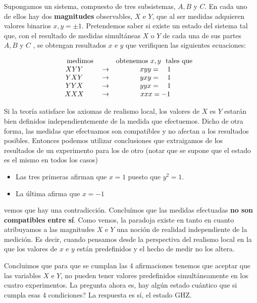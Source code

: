 \documentclass[a4paper,11pt]{book} %
\numberwithin{equation}{chapter}
\begin{document}
Supongamos un sistema, compuesto de  tres subsistemas, $A, B$ y $C$. En cada uno de ellos hay dos \textbf{magnitudes} observables, $X$ e $Y$, que al ser medidas adquieren valores binarios $x, y = \pm 1$. Pretendemos saber si existe un estado del sistema tal que, con el resultado  de  medidas simultáneas $X$ o $Y$ de cada una de sus partes $A,B$ y $C$ , se obtengan resultados $x$ e $y$ que verifiquen las siguientes ecuaciones:

$$
\begin{array}{ccc}
{\rm medimos} & & \hbox{obtenemos} ~ x,y ~~ \hbox{tales que} \\
XYY ~~~~~ &\to& ~xyy =~~~ 1\nonumber\\
YXY ~~~~~ &\to& ~yxy =~~~ 1 \\
YYX ~~~~~ &\to& ~yyx =~~~ 1\nonumber\\
XXX ~~~~~ &\to& ~xxx = -1\nonumber
\end{array}
$$

Si la teoría satisface los axiomas de realismo local,  los valores de $X$ es $Y$ estarán bien definidos independientemente de la medida que efectuemos. Dicho de otra forma, las medidas que efectuamos son compatibles y no afectan a los resultados posibles. Entonces podemos utilizar conclusiones que extraigamos de los resultados de un experimento para los de otro (notar que se supone que el estado es el mismo en todos los casos)
\begin{itemize}
	\item Las tres primeras afirman que $x=1$ puesto que $y^2=1$. 
	\item La última afirma que $x=-1$
\end{itemize}
vemos que hay una contradicción. Concluímos que las medidas efectuadas \textbf{no son compatibles entre sí}. Como vemos, la paradoja existe en tanto en cuanto atribuyamos a las magnitudes $X$ e $Y$ una noción de realidad  independiente de la medición. Es decir, cuando pensamos desde la perspectiva del realismo local en la que los valores de $x$ e $y$ están predefinidos y el hecho de medir no los altera. 

Concluimos que para que se cumplan las 4 afirmaciones tenemos que aceptar que las variables $X$ e $Y$, no pueden tener valores predefinidos simultáneamente  en los cuatro experimentos. La pregunta ahora es, hay algún estado cuántico que si cumpla esas 4 condiciones? La respuesta es sí, el estado GHZ.
\end{document}
